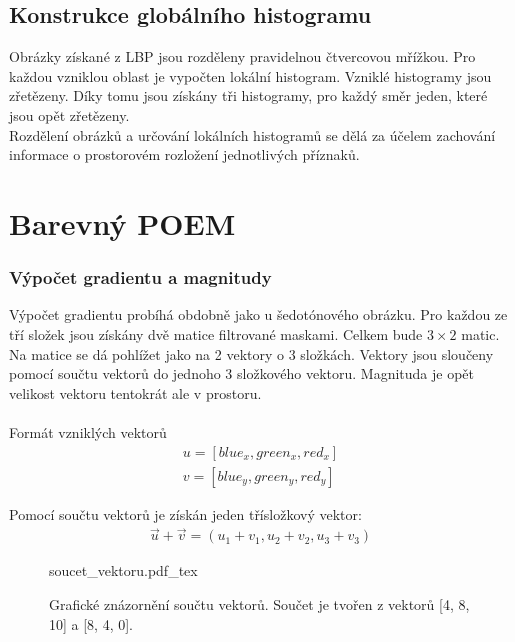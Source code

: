 \documentclass[czech,BP]{thesiskiv}
\begin{document}
\subsection{Konstrukce globálního histogramu}
\par Obrázky získané z LBP jsou rozděleny pravidelnou čtvercovou mřížkou. Pro každou vzniklou oblast je vypočten lokální histogram. Vzniklé histogramy jsou zřetězeny. Díky tomu jsou získány tři histogramy, pro každý směr jeden, které jsou opět zřetězeny. \\
Rozdělení obrázků a určování lokálních histogramů se dělá za účelem zachování informace o prostorovém rozložení jednotlivých příznaků.

\section{Barevný POEM}
\subsubsection{Výpočet gradientu a magnitudy}
Výpočet gradientu probíhá obdobně jako u šedotónového obrázku. Pro každou ze tří složek jsou získány dvě matice filtrované maskami. Celkem bude $3 \times 2$ matic. Na matice se dá pohlížet jako na 2 vektory o 3 složkách. Vektory jsou sloučeny pomocí součtu vektorů do jednoho 3 složkového vektoru. Magnituda je opět velikost vektoru tentokrát ale v prostoru. \\
\\
Formát vzniklých vektorů 
\begin{align}
	\label{barevny_poem_vznikle_vektory}
			 u = [blue_x, green_x, red_x] \\
			 v = [blue_y, green_y, red_y]
\end{align}

Pomocí součtu vektorů je získán jeden třísložkový vektor:
\begin{align}
   \label{soucet_vektrou} \vec{u} + \vec{v} = (u_1 + v_1, u_2 + v_2, u_3 + v_3 )
\end{align} 

\begin{figure}[H]
    \centering
    \def\svgwidth{\columnwidth}
    {soucet_vektoru.pdf_tex} 
    \caption{Grafické znázornění součtu vektorů. Součet je tvořen z vektorů [4, 8, 10] a [8, 4, 0].}
\end{figure}
\end{document}
